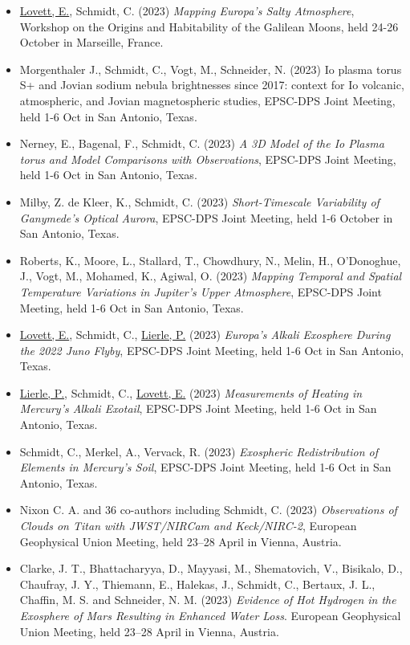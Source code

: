 \documentclass[12pt]{report}
\begin{document}
\begin{itemize}
   \item \underline{Lovett, E.}, Schmidt, C. (2023) \textit{Mapping Europa's Salty Atmosphere}, Workshop on the Origins and Habitability of the Galilean Moons, held 24-26 October in Marseille, France.
   \item Morgenthaler J., Schmidt, C., Vogt, M., Schneider, N. (2023) Io plasma torus S+ and Jovian sodium nebula brightnesses since 2017: context for Io volcanic, atmospheric, and Jovian magnetospheric studies, EPSC-DPS Joint Meeting, held 1-6 Oct in San Antonio, Texas.	
   \item Nerney, E., Bagenal, F., Schmidt, C. (2023) \textit{A 3D Model of the Io Plasma torus and Model Comparisons with Observations}, EPSC-DPS Joint Meeting, held 1-6 Oct in San Antonio, Texas.
   \item Milby, Z. de Kleer, K., Schmidt, C. (2023) \textit{Short-Timescale Variability of Ganymede's Optical Aurora}, EPSC-DPS Joint Meeting, held 1-6 October in San Antonio, Texas.	
   \item Roberts, K., Moore, L., Stallard, T., Chowdhury, N., Melin, H., O'Donoghue, J., Vogt, M., Mohamed, K., Agiwal, O. (2023) \textit{Mapping Temporal and Spatial Temperature Variations in Jupiter’s Upper Atmosphere}, EPSC-DPS Joint Meeting, held 1-6 Oct in San Antonio, Texas.	
   \item \underline{Lovett, E.}, Schmidt, C., \underline{Lierle, P.} (2023) \textit{Europa's Alkali Exosphere During the 2022 Juno Flyby}, EPSC-DPS Joint Meeting, held 1-6 Oct in San Antonio, Texas.	
   \item \underline{Lierle, P.}, Schmidt, C., \underline{Lovett, E.} (2023) \textit{Measurements of Heating in Mercury's Alkali Exotail}, EPSC-DPS Joint Meeting, held 1-6 Oct in San Antonio, Texas.
   \item Schmidt, C., Merkel, A., Vervack, R. (2023) \textit{Exospheric Redistribution of Elements in Mercury’s Soil}, EPSC-DPS Joint Meeting, held 1-6 Oct in San Antonio, Texas.
   \item Nixon C. A. and 36 co-authors including Schmidt, C. (2023) \textit{Observations of Clouds on Titan with JWST/NIRCam and Keck/NIRC-2}, European Geophysical Union Meeting, held 23–28 April in Vienna, Austria.
   \item Clarke, J. T., Bhattacharyya, D., Mayyasi, M., Shematovich, V., Bisikalo, D., Chaufray, J. Y., Thiemann, E., Halekas, J., Schmidt, C., Bertaux, J. L., Chaffin, M. S. and Schneider, N. M. (2023) \textit{Evidence of Hot Hydrogen in the Exosphere of Mars Resulting in Enhanced Water Loss}. European Geophysical Union Meeting, held 23–28 April in Vienna, Austria.

\end{itemize}
\end{document}
